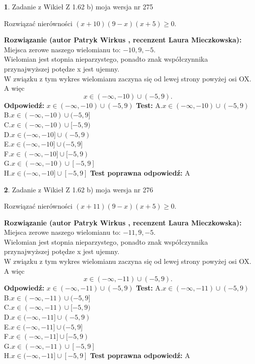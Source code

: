 \documentclass[12pt, a4paper]{article}
\theoremstyle{definition} %
\newtheorem{zad}{}
\newcommand{\zadStart}[1]{\begin{zad}#1\newline}
\newcommand{\zadStop}{\end{zad}}
\newcommand{\rozwStart}[2]{\noindent \textbf{Rozwiązanie (autor #1 , recenzent #2): }\newline}
\newcommand{\rozwStop}{\newline}
\newcommand{\odpStart}{\noindent \textbf{Odpowiedź:}\newline}
\newcommand{\odpStop}{\newline}
\newcommand{\testStart}{\noindent \textbf{Test:}\newline}
\newcommand{\testStop}{\newline}
\newcommand{\kluczStart}{\noindent \textbf{Test poprawna odpowiedź:}\newline}
\newcommand{\kluczStop}{\newline}
\begin{document}
\zadStart{Zadanie z Wikieł Z 1.62 b) moja wersja nr 275}

Rozwiązać nierówności $(x+10)(9-x)(x+5)\ge0$.
\zadStop
\rozwStart{Patryk Wirkus}{Laura Mieczkowska}
Miejsca zerowe naszego wielomianu to: $-10, 9, -5$.\\
Wielomian jest stopnia nieparzystego, ponadto znak współczynnika przy\linebreak najwyższej potędze x jest ujemny.\\ W związku z tym wykres wielomianu zaczyna się od lewej strony powyżej osi OX. A więc $$x \in (-\infty,-10) \cup (-5,9).$$
\rozwStop
\odpStart
$x \in (-\infty,-10) \cup (-5,9)$
\odpStop
\testStart
A.$x \in (-\infty,-10) \cup (-5,9)$\\
B.$x \in (-\infty,-10) \cup (-5,9]$\\
C.$x \in (-\infty,-10) \cup [-5,9)$\\
D.$x \in (-\infty,-10] \cup (-5,9)$\\
E.$x \in (-\infty,-10] \cup (-5,9]$\\
F.$x \in (-\infty,-10] \cup [-5,9)$\\
G.$x \in (-\infty,-10) \cup [-5,9]$\\
H.$x \in (-\infty,-10] \cup [-5,9]$
\testStop
\kluczStart
A
\kluczStop



\zadStart{Zadanie z Wikieł Z 1.62 b) moja wersja nr 276}

Rozwiązać nierówności $(x+11)(9-x)(x+5)\ge0$.
\zadStop
\rozwStart{Patryk Wirkus}{Laura Mieczkowska}
Miejsca zerowe naszego wielomianu to: $-11, 9, -5$.\\
Wielomian jest stopnia nieparzystego, ponadto znak współczynnika przy\linebreak najwyższej potędze x jest ujemny.\\ W związku z tym wykres wielomianu zaczyna się od lewej strony powyżej osi OX. A więc $$x \in (-\infty,-11) \cup (-5,9).$$
\rozwStop
\odpStart
$x \in (-\infty,-11) \cup (-5,9)$
\odpStop
\testStart
A.$x \in (-\infty,-11) \cup (-5,9)$\\
B.$x \in (-\infty,-11) \cup (-5,9]$\\
C.$x \in (-\infty,-11) \cup [-5,9)$\\
D.$x \in (-\infty,-11] \cup (-5,9)$\\
E.$x \in (-\infty,-11] \cup (-5,9]$\\
F.$x \in (-\infty,-11] \cup [-5,9)$\\
G.$x \in (-\infty,-11) \cup [-5,9]$\\
H.$x \in (-\infty,-11] \cup [-5,9]$
\testStop
\kluczStart
A
\kluczStop
\end{document}

